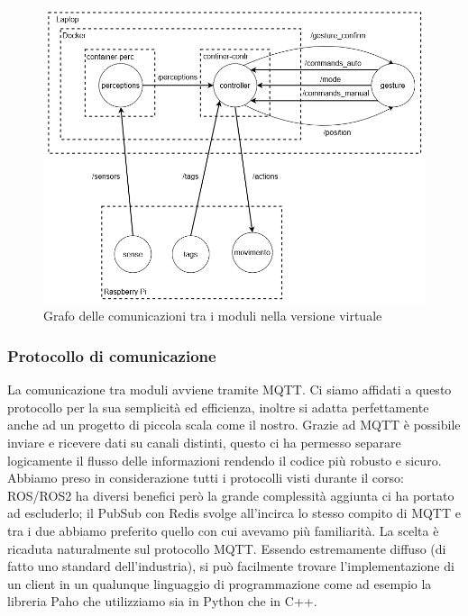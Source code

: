 \documentclass[]{article}
\begin{document}
\begin{figure}[H]
    \centering
    \includegraphics[width=0.7\linewidth]{immagini/comunicazione_moduli_fisico.png}
    \caption{Grafo delle comunicazioni tra i moduli nella versione virtuale}
       
\end{figure}

\subsubsection{Protocollo di comunicazione}
La comunicazione tra moduli avviene tramite MQTT. Ci siamo affidati a questo protocollo per la sua semplicità ed efficienza, inoltre si adatta perfettamente anche ad un progetto di piccola scala come il nostro.
Grazie ad MQTT è possibile inviare e ricevere dati su canali distinti, questo ci ha permesso separare logicamente il flusso delle informazioni rendendo il codice più robusto e sicuro.
Abbiamo preso in considerazione tutti i protocolli visti durante il corso: ROS/ROS2 ha diversi benefici però la grande complessità aggiunta ci ha portato ad escluderlo;
il PubSub con Redis svolge all'incirca lo stesso compito di MQTT e tra i due abbiamo preferito quello con cui avevamo più familiarità.
La scelta è ricaduta naturalmente sul protocollo MQTT.
Essendo estremamente diffuso (di fatto uno standard dell'industria), si può facilmente trovare l'implementazione di un client in un qualunque linguaggio di programmazione come ad esempio la libreria Paho
che utilizziamo sia in Python che in C++.
\end{document}
